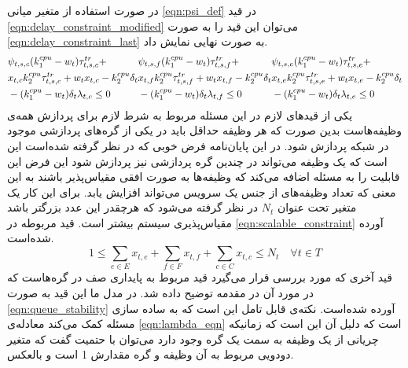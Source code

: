 	در صورت استفاده از متغیر میانی \cref{eqn:psi_def} در قید \cref{eqn:delay_constraint_modified} می‌توان این قید را به صورت \cref{eqn:delay_constraint_last} به صورت نهایی نمایش داد. 
	\begin{subequations}\label{eqn:delay_constraint_last}
		\begin{align}
		&\notag\psi_{t,s,c}(k_1^{cpu}-w_t)\tau^{tr}_{t,s,c} + \\ &\notag x_{t,c}k_2^{cpu}\tau_{t,s,c}^{tr}+w_t x_{t,c}-k_2^{cpu}\delta_t \\ &-(k_1^{cpu}-w_t)\delta_t\lambda_{t,c} \le 0
		\end{align}
		\begin{align}
		&\notag\psi_{t,s,f}(k_1^{cpu}-w_t)\tau^{tr}_{t,s,f} + \\ &\notag x_{t,f}k_2^{cpu}\tau_{t,s,f}^{tr}+w_t x_{t,f}-k_2^{cpu}\delta_t \\ &-(k_1^{cpu}-w_t)\delta_t\lambda_{t,f} \le 0
		\end{align}
		\begin{align}
		&\notag\psi_{t,s,e}(k_1^{cpu}-w_t)\tau^{tr}_{t,s,e} + \\ &\notag x_{t,e}k_2^{cpu}\tau_{t,s,e}^{tr}+w_t x_{t,e}-k_2^{cpu}\delta_t \\ &-(k_1^{cpu}-w_t)\delta_t\lambda_{t,e} \le 0
		\end{align}
	\end{subequations}
	یکی از قیدهای لازم در این مسئله مربوط به شرط لازم برای پردازش همه‌ی وظیفه‌هاست بدین صورت که هر وظیفه حداقل باید در یکی از گره‌های پردازشی موجود در شبکه پردازش شود. در این پایان‌نامه فرض خوبی که در نظر گرفته شده‌است این است که یک وظیفه می‌تواند در چندین گره پردازشی نیز پردازش شود این فرض این قابلیت را به مسئله اضافه می‌کند که وظیفه‌ها به صورت افقی مقیاس‌پذیر باشند به این معنی که تعداد وظیفه‌های از جنس یک سرویس می‌تواند افزایش یابد. برای این کار یک متغیر تحت عنوان $N_t$ در نظر گرفته می‌شود که هرچقدر این عدد بزرگتر باشد مقیاس‌پذیری سیستم بیشتر است. قید مربوطه در \cref{eqn:scalable_constraint} آورده شده‌است. 
	\begin{equation}\label{eqn:scalable_constraint}
		1 \le \sum_{e \in E}x_{t,e} + \sum_{f \in F}x_{t,f} + \sum_{c \in C}x_{t,c} \le N_t \quad \forall{t \in T}
	\end{equation}
	قید آخری که مورد بررسی قرار می‌گیرد قید مربوط به پایداری صف در گره‌هاست که در مورد آن در مقدمه توضیح داده شد. در مدل ما این قید به صورت \cref{eqn:queue_stability} آورده شده‌است. نکته‌ی قابل تامل این است که به ساده سازی مسئله کمک می‌کند معادله‌ی \cref{eqn:lambda_eqn} است که دلیل آن این است که زمانیکه چریانی از یک وظیفه به سمت یک گره وجود دارد می‌توان با حتمیت گفت که متغیر دودویی مربوط به آن وظیفه و گره مقدارش 1 است و بالعکس. 
